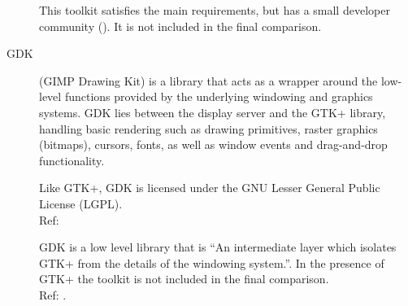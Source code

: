 \begin{description}
		This toolkit satisfies the main requirements, but has a small developer
		community (\cite{gled:gled}). It is not included in the final
		comparison.

    \item[GDK]  (GIMP Drawing Kit) is a library that acts as a wrapper around
		the low-level functions provided by the underlying windowing
		and graphics systems. GDK lies between the display server and
		the GTK+ library, handling basic rendering such as drawing
		primitives, raster graphics (bitmaps), cursors, fonts, as well
		as window events and drag-and-drop functionality.

		Like GTK+, GDK is licensed under the GNU Lesser General
		Public License (LGPL).
		\hspace*{\fill}\\Ref: \cite{wiki:gdk}

		GDK is a low level library that is ``An intermediate layer which
		isolates GTK+ from the details of the windowing system.''.  In the
		presence of GTK+ the toolkit is not included in the final comparison.
		\hspace*{\fill}\\Ref: \cite{gnome:gdk3}.

\end{description}

